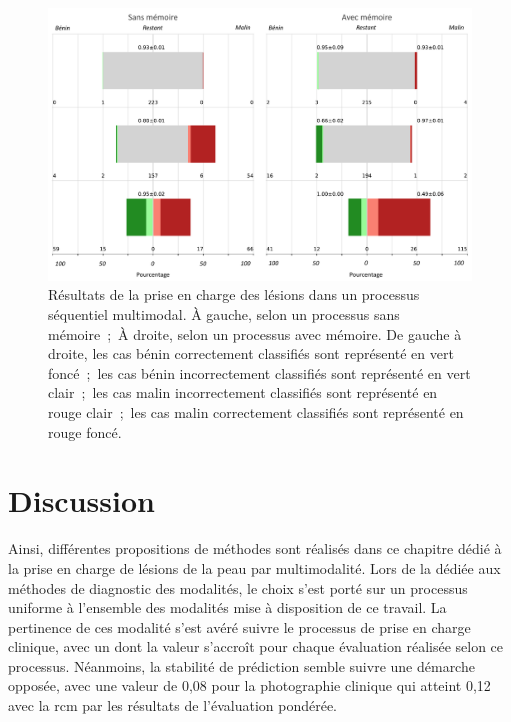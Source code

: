 \begin{figure}[H]
    \centering
    \includegraphics[width=0.9\linewidth]{contents/chapter_8/resources/results_lesions_management.pdf}
    \caption{Résultats de la prise en charge des lésions dans un processus séquentiel multimodal. À gauche, selon un processus sans mémoire~;~À droite, selon un processus avec mémoire. De gauche à droite, les cas bénin correctement classifiés sont représenté en vert foncé~;~les cas bénin incorrectement classifiés sont représenté en vert clair~;~les cas malin incorrectement classifiés sont représenté en rouge clair~;~les cas malin correctement classifiés sont représenté en rouge foncé.}
    \label{fig:results_lesions_management}
\end{figure}\par

\section{Discussion}
Ainsi, différentes propositions de méthodes sont réalisés dans ce chapitre dédié à la prise en charge de lésions de la peau par multimodalité. Lors de la  dédiée aux méthodes de diagnostic des modalités, le choix s'est porté sur un processus uniforme à l'ensemble des modalités mise à disposition de ce travail. La pertinence de ces modalité s'est avéré suivre le processus de prise en charge clinique, avec un \fscore{} dont la valeur s'accroît pour chaque évaluation réalisée selon ce processus. Néanmoins, la stabilité de prédiction semble suivre une démarche opposée, avec une valeur de 0,08 pour la photographie clinique qui atteint 0,12 avec la \gls{rcm} par les résultats de l'évaluation pondérée.\par

